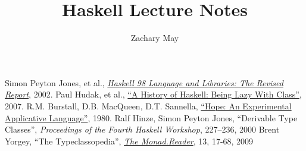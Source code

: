 \documentclass[12pt]{article}
\author{Zachary May}
\title{Haskell Lecture Notes}
\begin{document}
\maketitle










\begin{thebibliography}{99}
  Simon Peyton Jones, et al.,
  \href{http://www.haskell.org/onlinereport/index.html}{\emph{Haskell 98 Language and Libraries: The Revised Report}},
  2002.
  Paul Hudak, et al.,
  \href{http://www.scs.stanford.edu/\~dbg/readings/haskell-history.pdf}{``A History of Haskell: Being Lazy With Class''},
  2007.
  R.M. Burstall, D.B. MacQueen, D.T. Sannella,
  \href{http://homepages.inf.ed.ac.uk/dts/pub/hope.pdf}{``Hope: An Experimental Applicative Language''},
  1980.
  Ralf Hinze, Simon Peyton Jones,
  ``Derivable Type Classes'',
  \emph{Proceedings of the Fourth Haskell Workshop}, 227--236,
  2000
  Brent Yorgey,
  ``The Typeclassopedia'',
  \href{http://www.haskell.org/wikiupload/8/85/TMR-Issue13.pdf}{\emph{The Monad.Reader}}, 13, 17-68,
  2009
\end{thebibliography}
\end{document}

